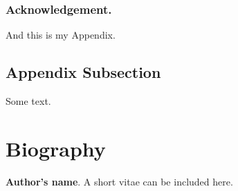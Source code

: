 \documentclass{river-journal}
\begin{document}
\subsubsection{Acknowledgement.}
\label{sec:acknowledgement}

\appendix

And this is my Appendix.

\subsection*{Appendix Subsection}

Some text.

\nocite{*} %



{}




\section*{Biography}


\medskip
\noindent
{\bf Author's name}. A short vitae can be included here.
\end{document}
